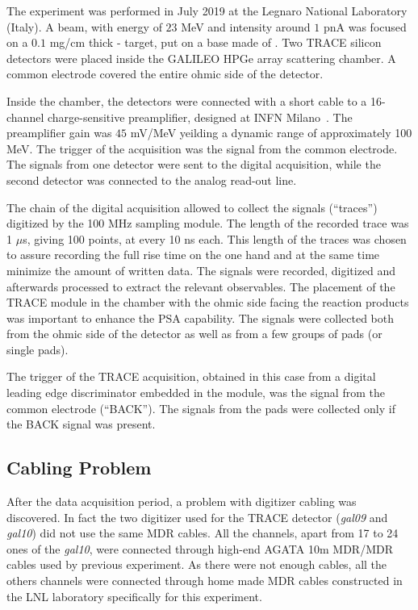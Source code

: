 The experiment was performed in July 2019 at the Legnaro National Laboratory
(Italy). A  beam, with energy of $23$ MeV and intensity around $1$ pnA
was focused on a $0.1$ mg/cm thick  - target, put on a base
made of .
Two TRACE silicon detectors were placed inside the GALILEO HPGe array
scattering chamber. A common electrode covered the entire ohmic side of the
detector.

\bigbreak

Inside the chamber, the detectors were connected with a short cable to a
16-channel charge-sensitive preamplifier, designed at INFN Milano~\cite{strano}.
The preamplifier gain was $45$ mV/MeV yeilding a dynamic range of
approximately 100 MeV. The trigger of the acquisition was the signal from the
common electrode. The signals from one detector were sent to the digital
acquisition, while the second detector was connected to the analog read-out
line.

\bigbreak

The chain of the digital acquisition allowed to collect the signals (“traces”)
digitized by the 100 MHz sampling module. The length of the recorded trace was
1 $\mu$s, giving 100 points, at every 10 ns each. This length of the traces
was chosen to assure recording the full rise time on the one hand and at the
same time minimize the amount of written data. The signals were recorded,
digitized and afterwards processed to extract the relevant observables. The
placement of the TRACE module in the chamber with the ohmic side facing the
reaction products was important to enhance the PSA capability. The signals
were collected both from the ohmic side of the detector as well as from a few
groups of pads (or single pads).

\bigbreak

The trigger of the TRACE acquisition, obtained in this case from a digital
leading edge discriminator embedded in the module, was the signal from the
common electrode (“BACK”). The signals from the pads were collected only if
the BACK signal was present.

\subsection{Cabling Problem}

After the data acquisition period, a problem with digitizer cabling was
discovered. In fact the two digitizer used for the TRACE detector
(\textit{gal09} and \textit{gal10}) did not use the same MDR cables. All the
channels, apart from 17 to 24 ones of the \textit{gal10}, were connected through
high-end AGATA 10m MDR/MDR cables used by previous experiment. As there were
not enough cables, all the others channels were connected through home made
MDR cables constructed in the LNL laboratory specifically for this experiment.

